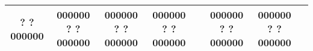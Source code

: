 \begin{tabular}{|*{7}{@{}c@{}|}l|}
        {}{}{?} {} {}{?}   {0}{0}{0}{0}{0}{0} &       %
        {}{}{} {} {}{}   {0}{0}{0}{0}{0}{0}         %
        {}{}{?} {} {}{?}   {0}{0}{0}{0}{0}{0} &       %
        {}{}{} {} {}{}   {0}{0}{0}{0}{0}{0}         %
        {}{}{?} {} {}{?}   {0}{0}{0}{0}{0}{0} &       %
        {}{}{} {} {}{}   {0}{0}{0}{0}{0}{0}         %
        {}{}{?} {} {}{?}   {0}{0}{0}{0}{0}{0} &&      %
        {}{}{} {} {}{}   {0}{0}{0}{0}{0}{0}         %
        {}{}{?} {} {}{?}   {0}{0}{0}{0}{0}{0} &       %
        {}{}{} {} {}{}   {0}{0}{0}{0}{0}{0}         %
        {}{}{?} {} {}{?}   {0}{0}{0}{0}{0}{0} &       %
\\ \hline
\end{tabular}
